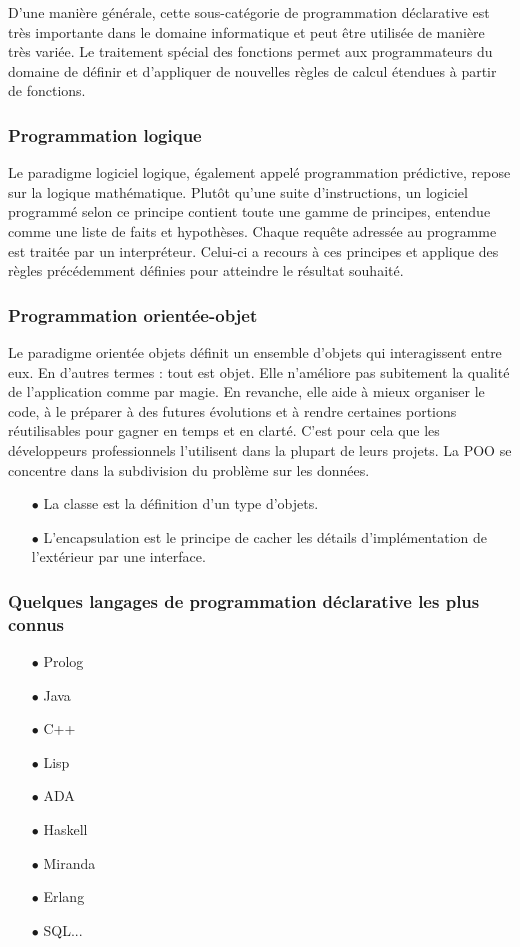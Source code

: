 \documentclass[a4paper,12pt]{article} %
\begin{document}
D’une manière générale, cette sous-catégorie de programmation déclarative est très importante dans le domaine informatique et peut être utilisée de manière très variée. Le traitement spécial des fonctions permet aux programmateurs du domaine de définir et d’appliquer de nouvelles règles de calcul étendues à partir de fonctions.

\subsubsection{Programmation logique}

Le paradigme logiciel logique, également appelé programmation prédictive, repose sur la logique mathématique. Plutôt qu’une suite d’instructions, un logiciel programmé selon ce principe contient toute une gamme de principes, entendue comme une liste de faits et hypothèses. Chaque requête adressée au programme est traitée par un interpréteur. Celui-ci a recours à ces principes et applique des règles précédemment définies pour atteindre le résultat souhaité.

\subsubsection{Programmation orientée-objet}

Le paradigme orientée objets définit un ensemble d'objets qui interagissent entre eux. En d'autres termes : tout est objet. Elle n’améliore pas subitement la qualité de l’application comme par magie. En
revanche, elle aide à mieux organiser le code, à le préparer à des futures évolutions et à rendre certaines portions réutilisables pour gagner en temps et en clarté. C'est pour cela que les développeurs professionnels l'utilisent dans la plupart de leurs projets.
La POO se concentre dans la subdivision du problème sur les données.
\begin{itemize}
   \item[$\bullet$]La classe est la définition d’un type d’objets.
   \item[$\bullet$]L’encapsulation est le principe de cacher les détails d’implémentation de l’extérieur par une interface.
\end{itemize}

\subsubsection{Quelques langages de programmation déclarative les plus connus }
\begin{itemize}
   \item[$\bullet$]Prolog
   \item[$\bullet$]Java 
   \item[$\bullet$]C++
   \item[$\bullet$]Lisp
   \item[$\bullet$]ADA
   \item[$\bullet$]Haskell
   \item[$\bullet$]Miranda
   \item[$\bullet$]Erlang
   \item[$\bullet$]SQL...
\end{itemize}
\end{document}
